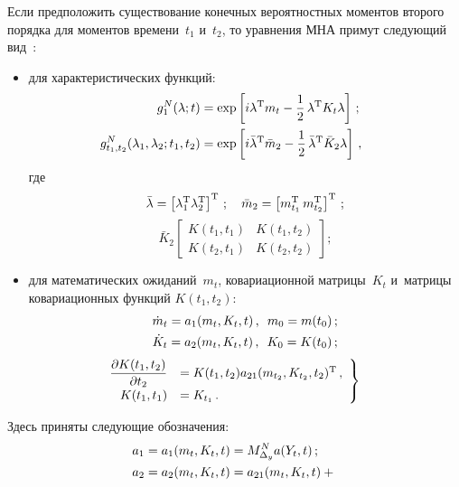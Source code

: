 \begin{multicols}{2}
Если предположить существование конечных вероятностных моментов
второго порядка для моментов времени~$t_1$ и~$t_2$, то уравнения
МНА примут следующий вид~\cite{2-sin, 3-sin}:
\begin{itemize}
\item  для характеристических функций:
    \begin{align}
       \hspace*{-8mm}g_1^N (\lambda;t) &=\exp \lk i\lambda^{\mathrm{T}} m_t - \fr{1}{2}\,
     \lambda^{\mathrm{T}} K_t \lambda\rk\,;\label{e2.6-sin}\\
   \hspace*{-8mm}g_{t_1, t_2}^N (\lambda_1, \lambda_2;t_1, t_2 ) &=\exp \lk i\bar \lambda^{\mathrm{T}}
    \bar m_2 - \fr{1}{2}\, \bar \lambda^{\mathrm{T}} \bar K_2 \lambda\rk\,,\label{e2.7-sin}
    \end{align}
где
    $$
    \bar \lambda =\left[ \lambda_1^{\mathrm{T}}\lambda_2^{\mathrm{T}}\right]^{\mathrm{T}}\,;
    \quad\bar m_2 = \left[ m_{t_1}^{\mathrm{T}}\, m_{t_2}^{\mathrm{T}}\right]^{\mathrm{T}}\,;
    $$
    $$
    \bar K_2 \begin{bmatrix}
    K(t_1, t_1)& K(t_1, t_2)\\
    K(t_2, t_1)& K(t_2, t_2)\end{bmatrix};
    $$
\item  для математических ожиданий~$m_t$, ковариационной матрицы~$K_t$
и~матрицы ковариационных функций $K(t_1, t_2)$:
  \begin{gather}
  \dot m_t = a_1 (m_t, K_t, t)\,,\enskip m_0 = m(t_0)\,;\label{e2.8-sin}\\
\dot K_t = a_2 (m_t, K_t, t)\,,\enskip K_0 = K(t_0)\,;\label{e2.9-sin}
\end{gather}
\begin{equation}
\left.
\begin{array}{rl}
\hspace*{-8mm}\fr{\prt K(t_1, t_2)}{\prt t_2 }&= K(t_1, t_2) a_{21} (m_{t_2}, K_{t_2}, t_2)^{\mathrm{T}}\,,
\\[6pt]
\hspace*{-8mm} K(t_1, t_1) &= K_{t_1}\,.
 \end{array}
 \right\}
 \label{e2.10-sin}
\end{equation}
    \end{itemize}
Здесь приняты следующие обозначения:
    \begin{align}
a_1 &= a_1 (m_t, K_t, t) = M_{\Delta_y}^N a (Y_t, t)\,;\label{e2.11-sin}\\
a_2 &= a_2 (m_t, K_t, t) = a_{21} (m_t, K_t, t)+{}\notag\\

\end{align}
\end{multicols}
